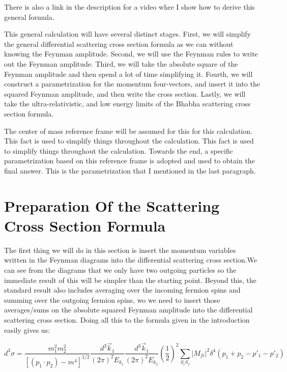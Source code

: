 \documentclass[a4]{article}
\begin{document}
    There is also a link in the description for a video whre I show how to derive this general formula.

    This general calculation will have several distinct stages. First, we will simplify the general differential scattering cross section formula as we can without knowing the Feynman amplitude.
    Second, we will use the Feynman rules to write out the Feynman amplitude. Third, we will take the absolute square of the Feynman amplitude and then spend a lot of time simplifying it. Fourth,
    we will construct a parametrization for the momentum four-vectors, and insert it into the squared Feynman amplitude, and then write the cross section. Lastly, we will take the ultra-relativistic,
    and low energy limits of the Bhabha scattering cross section formula.

    The center of mass reference frame will be assumed for this for this calculation. This fact is used to simplify things throughout the calculation. This fact is used to simplify things throughout
    the calculation. Towards the end, a specific parametrization based on this reference frame is adopted and used to obtain the final answer. This is the parametrization that I mentioned in the last
    paragraph.

    \section*{Preparation Of the Scattering Cross Section Formula}

    The first thing we will do in this section is insert the momentum variables written in the Feynman diagrams into the differential scattering cross section.We can see from the diagrams that we only
    have two outgoing particles so the immediate result of this will be simpler than the starting point. Beyond this, the standard result also includes averaging over the incoming fermion spins and
    summing over the outgoing fermion spins, wo we need to insert those averages/sums on the absolute squared Feynman amplitude into the differential scattering cross section. Doing all this to the
    formula given in the introduction easily gives us:

    \begin{equation}
        d^3 \sigma = \frac{m_1^2 m_2^2}{[(p_1 \cdot p_2) - m^4]^{1/2}} \frac{d^3 \vec{k}_1}{(2 \pi)^2 E_{k_1}} \frac{d^3 \vec{k}_1}{(2 \pi)^2 E_{k_2}} (\frac{1}{2})^2 \sum_{S_i S_f} |M_{fi}|^2 \delta^4 (p_1 + p_2 - p'_1 - p'_2)
    \end{equation}
\end{document}
